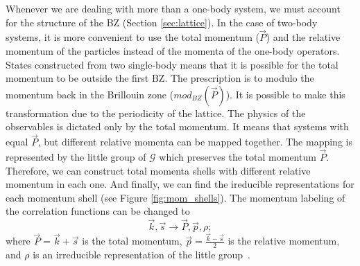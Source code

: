 Whenever we are dealing with more than a one-body system, we must account for the structure of the BZ (Section \ref{sec:lattice}). In the case of two-body systems, it is more convenient to use the total momentum ($\vec{P}$) and the relative momentum of the particles instead of the momenta of the one-body operators. States constructed from two single-body means that it is possible for the total momentum to be outside the first BZ. The prescription is to modulo the momentum back in the Brillouin zone ($mod_{BZ}(\vec{P})$). It is possible to make this transformation due to the periodicity of the lattice. The physics of the observables is dictated only by the total momentum. It means that systems with equal $\vec{P}$, but different relative momenta can be mapped together. The mapping is represented by the little group of $\mathcal{G}$ which preserves the total momentum $\vec{P}$. Therefore, we can construct total momenta shells with different relative momentum in each one. And finally, we can find the ireducible representations for each momentum shell (see Figure \ref{fig:mom_shells}). The momentum labeling of the correlation functions can be changed to
\begin{equation}
  \vec{k},\vec{s} \longrightarrow \vec{P},\vec{p},\rho;
\end{equation}
where $\vec{P} = \vec{k}+\vec{s}$ is the total momentum, $\vec{p} = \frac{\vec{k}-\vec{s}}{2}$ is the relative momentum, and $\rho$ is an irreducible representation of the little group~\cite{evan}.